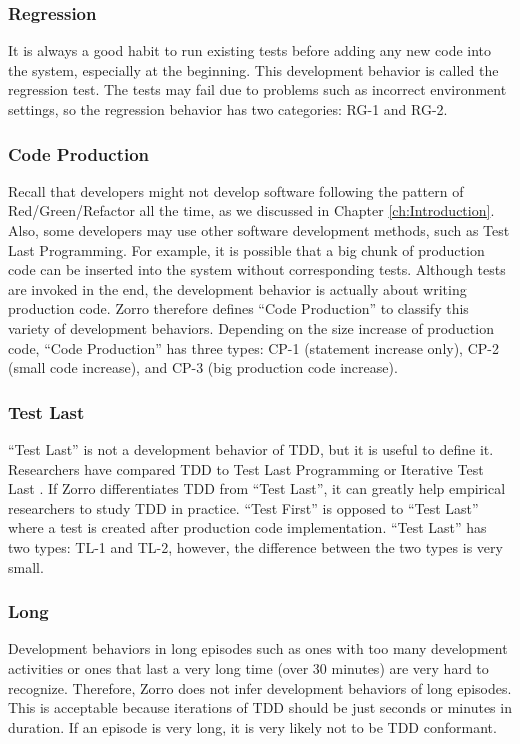 \subsubsection{Regression}
It is always a good habit to run existing tests before adding any new 
code into the system, especially at the beginning. This development behavior
is called the regression test. The tests may fail due to problems such 
as incorrect environment settings, so the regression behavior has two 
categories: RG-1 and RG-2. 

\subsubsection{Code Production}
Recall that developers might not develop software 
following the pattern of Red/Green/Refactor all the time, as we discussed
in Chapter \ref{ch:Introduction}. Also, some developers may use 
other software development methods, such as Test Last Programming. 
For example, it is possible that a big chunk of production code can be inserted 
into the system without corresponding tests. Although tests
are invoked in the end, the development behavior is actually about 
writing production code. Zorro therefore defines ``Code Production'' to 
classify this variety of development behaviors. Depending on the size increase 
of production code, ``Code Production'' has three types: CP-1 (statement 
increase only), CP-2 (small code increase), and CP-3 (big production code 
increase).

\subsubsection{Test Last}
``Test Last'' is not a development behavior of TDD, but it is useful
to define it. Researchers have compared TDD to Test Last Programming or
Iterative Test Last \cite{Erdogmus:05,Matjaz:03}. If Zorro differentiates 
TDD from ``Test Last'', it can greatly help empirical researchers to study
TDD in practice.  ``Test First''  is opposed to ``Test Last'' where a test 
is created after production code implementation. ``Test Last'' has two
types: TL-1 and TL-2, however, the difference between the two types is 
very small. 

\subsubsection{Long}
Development behaviors in long episodes such as ones with too many 
development activities or ones that last a very long time (over 30 minutes)
are very hard to recognize. Therefore, Zorro does not infer development 
behaviors of long episodes. This is acceptable because iterations of TDD 
should be just seconds or minutes in duration\cite{Beck:01}. If an episode 
is very long, it is very likely not to be TDD conformant. 

